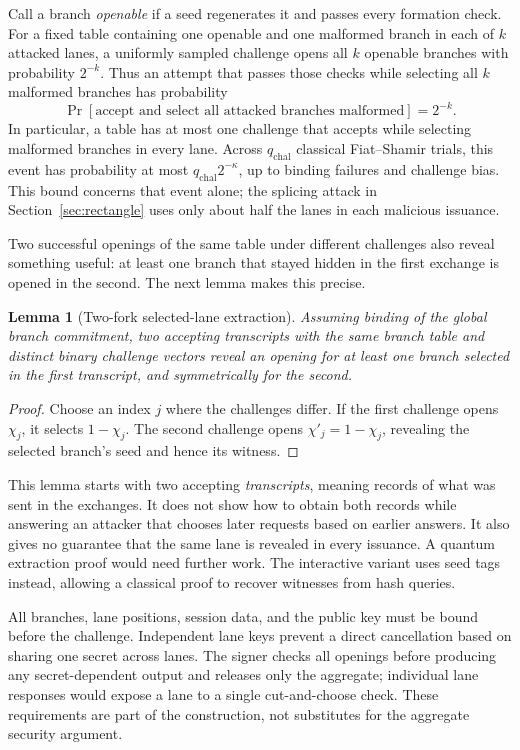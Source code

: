 \documentclass[10pt]{article}
\newtheorem{lemma}{Lemma}
\begin{document}
Call a branch \emph{openable} if a seed regenerates it and passes every
formation check.  For a fixed table containing one openable and one malformed
branch in each of $k$ attacked lanes, a uniformly sampled challenge opens all
$k$ openable branches with probability $2^{-k}$.  Thus an attempt that passes
those checks while selecting all $k$ malformed branches has probability
\[
 \Pr[\text{accept and select all attacked branches malformed}]=2^{-k}.
\]
In particular, a table has at most one challenge that accepts while selecting
malformed branches in every lane.  Across $q_{\mathrm{chal}}$ classical
Fiat--Shamir trials, this event has probability at most
$q_{\mathrm{chal}}2^{-\kappa}$, up to binding failures and challenge bias.
This bound concerns that event alone; the splicing attack in
Section~\ref{sec:rectangle} uses only about half the lanes in each malicious
issuance.

Two successful openings of the same table under different challenges also
reveal something useful: at least one branch that stayed hidden in the first
exchange is opened in the second.  The next lemma makes this precise.

\begin{lemma}[Two-fork selected-lane extraction]
Assuming binding of the global branch commitment, two accepting transcripts
with the same branch table and distinct binary challenge vectors reveal an
opening for at least one branch selected in the first transcript, and
symmetrically for the second.
\end{lemma}

\begin{proof}
Choose an index $j$ where the challenges differ.  If the first challenge opens
$\chi_j$, it selects $1-\chi_j$.  The second challenge opens
$\chi'_j=1-\chi_j$, revealing the selected branch's seed and hence its witness.
\end{proof}

This lemma starts with two accepting \emph{transcripts}, meaning records of
what was sent in the exchanges.  It does not show how to obtain both records
while answering an attacker that chooses later requests based on earlier
answers.  It also gives no guarantee that the same lane is revealed in every
issuance.  A quantum extraction proof would need further work.  The
interactive variant uses seed tags instead, allowing a classical proof to
recover witnesses from hash queries.

All branches, lane positions, session data, and the public key must be bound
before the challenge.  Independent lane keys prevent a direct cancellation
based on sharing one secret across lanes.  The signer checks all openings
before producing any secret-dependent output and releases only the aggregate;
individual lane responses would expose a lane to a single cut-and-choose
check.  These requirements are part of the construction, not substitutes for
the aggregate security argument.
\end{document}
